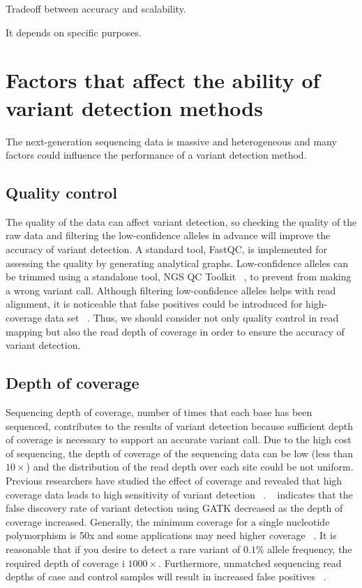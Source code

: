 \documentclass[11pt,reqno]{amsart}
\begin{document}
Tradeoff between accuracy and scalability.

It depends on specific purposes.

\section{Factors that affect the ability of variant detection methods}
The next-generation sequencing data is massive and heterogeneous and many factors could influence the performance of a variant detection method.
\subsection{Quality control}
The quality of the data can affect variant detection, so checking the quality of the raw data and filtering the low-confidence alleles in advance will improve the accuracy of variant detection.
A standard tool, FastQC, is implemented for assessing the quality by generating analytical graphs.
Low-confidence alleles can be trimmed using a standalone tool, NGS QC Toolkit ~\citep{patel2012ngs}, to prevent from making a wrong variant call.
Although filtering low-confidence alleles helps with read alignment, it is noticeable that false positives could be introduced for high-coverage data set ~\citep{liu2012steps}.
Thus, we should consider not only quality control in read mapping but also the read depth of coverage in order to ensure the accuracy of variant detection.

\subsection{Depth of coverage}
Sequencing depth of coverage, number of times that each base has been sequenced, contributes to the results of variant detection because sufficient depth of coverage is necessary to support an accurate variant call.
Due to the high cost of sequencing, the depth of coverage of the sequencing data can be low (less than $10\times$) and the distribution of the read depth over each site could be not uniform.
Previous researchers have studied the effect of coverage and revealed that high coverage data leads to high sensitivity of variant detection ~\citep{neuman2013analysis, krawitz2010microindel}.
~\citep{liu2013variant} indicates that the false discovery rate of variant detection using GATK decreased as the depth of coverage increased.
Generally, the minimum coverage for a single nucleotide polymorphism is 50x and some applications may need higher coverage ~\citep{Schlotterer2014}.
It is reasonable that if you desire to detect a rare variant of $0.1 \%$ allele frequency, the required depth of coverage i $1000\times$.
Furthermore, unmatched sequencing read depths of case and control samples will result in increased false positives ~\citep{garner2011confounded}.
\end{document}
